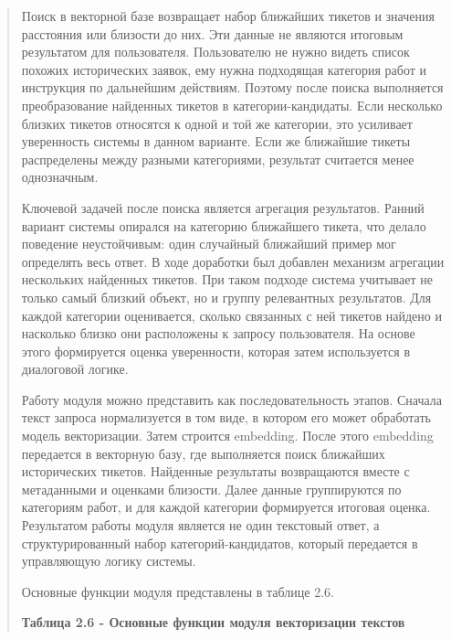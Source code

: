 \begin{quote}
Поиск в векторной базе возвращает набор ближайших тикетов и значения
расстояния или близости до них. Эти данные не являются итоговым
результатом для пользователя. Пользователю не нужно видеть список
похожих исторических заявок, ему нужна подходящая категория работ и
инструкция по дальнейшим действиям. Поэтому после поиска выполняется
преобразование найденных тикетов в категории-кандидаты. Если несколько
близких тикетов относятся к одной и той же категории, это усиливает
уверенность системы в данном варианте. Если же ближайшие тикеты
распределены между разными категориями, результат считается менее
однозначным.

Ключевой задачей после поиска является агрегация результатов. Ранний
вариант системы опирался на категорию ближайшего тикета, что делало
поведение неустойчивым: один случайный ближайший пример мог определять
весь ответ. В ходе доработки был добавлен механизм агрегации нескольких
найденных тикетов. При таком подходе система учитывает не только самый
близкий объект, но и группу релевантных результатов. Для каждой
категории оценивается, сколько связанных с ней тикетов найдено и
насколько близко они расположены к запросу пользователя. На основе этого
формируется оценка уверенности, которая затем используется в диалоговой
логике.

Работу модуля можно представить как последовательность этапов. Сначала
текст запроса нормализуется в том виде, в котором его может обработать
модель векторизации. Затем строится embedding. После этого embedding
передается в векторную базу, где выполняется поиск ближайших
исторических тикетов. Найденные результаты возвращаются вместе с
метаданными и оценками близости. Далее данные группируются по категориям
работ, и для каждой категории формируется итоговая оценка. Результатом
работы модуля является не один текстовый ответ, а структурированный
набор категорий-кандидатов, который передается в управляющую логику
системы.

Основные функции модуля представлены в таблице 2.6.

\textbf{Таблица 2.6 - Основные функции модуля векторизации текстов}
\end{quote}

